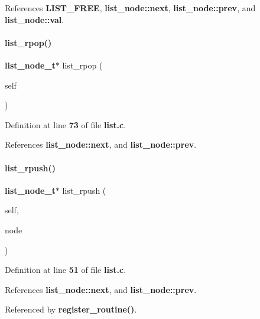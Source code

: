 References \textbf{ L\+I\+S\+T\+\_\+\+F\+R\+EE}, \textbf{ list\+\_\+node\+::next}, \textbf{ list\+\_\+node\+::prev}, and \textbf{ list\+\_\+node\+::val}.

\mbox{\label{list_8h_a53460b319b561ce2201bbf95450f1af7}} 
\paragraph{list\+\_\+rpop()}
{\footnotesize\ttfamily \textbf{ list\+\_\+node\+\_\+t}$\ast$ list\+\_\+rpop (\begin{DoxyParamCaption}\item[{\textbf{ list\+\_\+t} $\ast$}]{self }\end{DoxyParamCaption})}



Definition at line \textbf{ 73} of file \textbf{ list.\+c}.



References \textbf{ list\+\_\+node\+::next}, and \textbf{ list\+\_\+node\+::prev}.

\mbox{\label{list_8h_a4edfa9b7742154bff4fc2cb05d044af9}} 
\paragraph{list\+\_\+rpush()}
{\footnotesize\ttfamily \textbf{ list\+\_\+node\+\_\+t}$\ast$ list\+\_\+rpush (\begin{DoxyParamCaption}\item[{\textbf{ list\+\_\+t} $\ast$}]{self,  }\item[{\textbf{ list\+\_\+node\+\_\+t} $\ast$}]{node }\end{DoxyParamCaption})}



Definition at line \textbf{ 51} of file \textbf{ list.\+c}.



References \textbf{ list\+\_\+node\+::next}, and \textbf{ list\+\_\+node\+::prev}.



Referenced by \textbf{ register\+\_\+routine()}.

